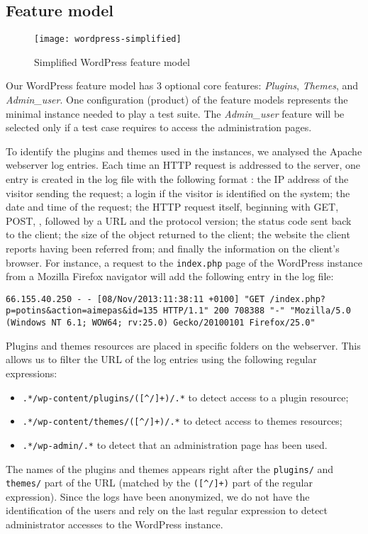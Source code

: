 \subsection{Feature model} 

\label{subsec:wordpress:fm}

\begin{figure}
\centering
\texttt{[image: wordpress-simplified]}
\caption{Simplified WordPress feature model}
\label{fig:wordpressfm}
\end{figure}

Our WordPress feature model has 3 optional core features: \textit{Plugins}, \textit{Themes}, and \textit{Admin\_user}. One configuration (\ie product) of the feature models represents the minimal instance needed to play a test suite. The \textit{Admin\_user} feature will be selected only if a test case requires to access the administration pages. 

To identify the plugins and themes used in the instances, we analysed the Apache webserver log entries. Each time an HTTP request is addressed to the server, one entry is created in the log file with the following format \cite{apacheserver}: the IP address of the visitor sending the request; a login if the visitor is identified on the system; the date and time of the request; the HTTP request itself, beginning with  GET, POST, \etc, followed by a URL and the protocol version; the status code sent back to the client; the size of the object returned to the client; the website the client reports having been referred from; and finally the information on the client's browser. For instance, a request to the \texttt{index.php} page of the WordPress instance from a Mozilla Firefox navigator will add the following entry in the log file:
%
\begin{lstlisting}[basicstyle=\footnotesize\ttfamily,frame=single,breaklines,columns=flexible]
66.155.40.250 - - [08/Nov/2013:11:38:11 +0100] "GET /index.php?p=potins&action=aimepas&id=135 HTTP/1.1" 200 708388 "-" "Mozilla/5.0 (Windows NT 6.1; WOW64; rv:25.0) Gecko/20100101 Firefox/25.0"
\end{lstlisting}
%
Plugins and themes resources are placed in specific folders on the webserver. This allows us to filter the URL of the log entries using the following regular expressions:
\begin{itemize}
\item \verb?.*/wp-content/plugins/([^/]+)/.*? to detect access to a plugin resource;
\item \verb?.*/wp-content/themes/([^/]+)/.*? to detect access to themes resources;
\item \verb?.*/wp-admin/.*? to detect that an administration page has been used.
\end{itemize}
The names of the plugins and themes appears right after the \texttt{plugins/} and \texttt{themes/} part of the URL (matched by the \verb?([^/]+)? part of the regular expression). Since the logs have been anonymized, we do not have the identification of the users and rely on the last regular expression to detect administrator accesses to the WordPress instance.

